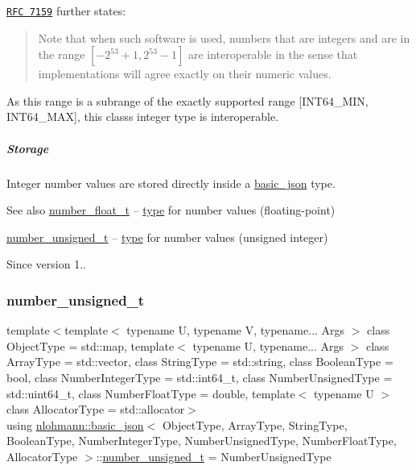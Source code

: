\href{http://rfc7159.net/rfc7159}{\tt R\+FC 7159} further states\+: \begin{quote}
Note that when such software is used, numbers that are integers and are in the range $[-2^{53}+1, 2^{53}-1]$ are interoperable in the sense that implementations will agree exactly on their numeric values. \end{quote}


As this range is a subrange of the exactly supported range \mbox{[}I\+N\+T64\+\_\+\+M\+IN, I\+N\+T64\+\_\+\+M\+AX\mbox{]}, this class\textquotesingle{}s integer type is interoperable.

\subparagraph*{Storage}

Integer number values are stored directly inside a \hyperlink{classnlohmann_1_1basic__json}{basic\+\_\+json} type.

\begin{DoxySeeAlso}{See also}
\hyperlink{classnlohmann_1_1basic__json_a74a0013e847fdc574b48f931f0e757e1}{number\+\_\+float\+\_\+t} -- \hyperlink{classnlohmann_1_1basic__json_a5d466b240d0ba9f648d7fd4ff42359f5}{type} for number values (floating-\/point)

\hyperlink{classnlohmann_1_1basic__json_a60a04166c122072ab11eaf9845d9cd1d}{number\+\_\+unsigned\+\_\+t} -- \hyperlink{classnlohmann_1_1basic__json_a5d466b240d0ba9f648d7fd4ff42359f5}{type} for number values (unsigned integer)
\end{DoxySeeAlso}
\begin{DoxySince}{Since}
version 1.. 
\end{DoxySince}
\hypertarget{classnlohmann_1_1basic__json_a60a04166c122072ab11eaf9845d9cd1d}{}\label{classnlohmann_1_1basic__json_a60a04166c122072ab11eaf9845d9cd1d} 
\subsubsection{\texorpdfstring{number\+\_\+unsigned\+\_\+t}{number\_unsigned\_t}}
{\footnotesize\ttfamily template$<$template$<$ typename U, typename V, typename... Args $>$ class Object\+Type = std\+::map, template$<$ typename U, typename... Args $>$ class Array\+Type = std\+::vector, class String\+Type  = std\+::string, class Boolean\+Type  = bool, class Number\+Integer\+Type  = std\+::int64\+\_\+t, class Number\+Unsigned\+Type  = std\+::uint64\+\_\+t, class Number\+Float\+Type  = double, template$<$ typename U $>$ class Allocator\+Type = std\+::allocator$>$ \\
using \hyperlink{classnlohmann_1_1basic__json}{nlohmann\+::basic\+\_\+json}$<$ Object\+Type, Array\+Type, String\+Type, Boolean\+Type, Number\+Integer\+Type, Number\+Unsigned\+Type, Number\+Float\+Type, Allocator\+Type $>$\+::\hyperlink{classnlohmann_1_1basic__json_a60a04166c122072ab11eaf9845d9cd1d}{number\+\_\+unsigned\+\_\+t} =  Number\+Unsigned\+Type}



